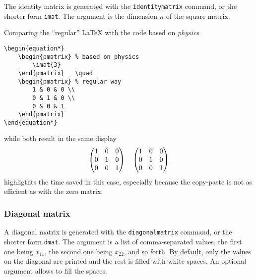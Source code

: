 		
			The identity matrix is generated with the \texttt{identitymatrix} command, or the shorter form \texttt{imat}.
			The argument is the dimension $n$ of the square matrix.
			
			
			Comparing the \enquote{regular} \LaTeX{} with the code based on \emph{physics}
\begin{lstlisting}[language={[LaTeX]TeX}]
\begin{equation*}
	\begin{pmatrix} % based on physics
		\imat{3}
	\end{pmatrix}	\quad
	\begin{pmatrix} % regular way
		1 & 0 & 0 \\
		0 & 1 & 0 \\
		0 & 0 & 1
	\end{pmatrix}
\end{equation*}
\end{lstlisting}
			while both result in the same display
			\begin{equation*}
				\begin{pmatrix} %
					\imat{3}
				\end{pmatrix}	\quad
				\begin{pmatrix} %
					1 & 0 & 0 \\
					0 & 1 & 0 \\
					0 & 0 & 1
				\end{pmatrix}
			\end{equation*}
			highligthts the time saved in this case, especially because the copy-paste is not as efficient as with the zero matrix.
			
		
		
		\subsubsection{Diagonal matrix}
		
			
			A diagonal matrix is generated with the \texttt{diagonalmatrix} command, or the shorter form \texttt{dmat}.
			The argument is a list of comma-separated values, the first one being $x_{11}$, the second one being $x_{22}$, and so forth.
			By default, only the values on the diagonal are printed and the rest is filled with white spaces.
			An optional argument allows to fill the spaces.
			
